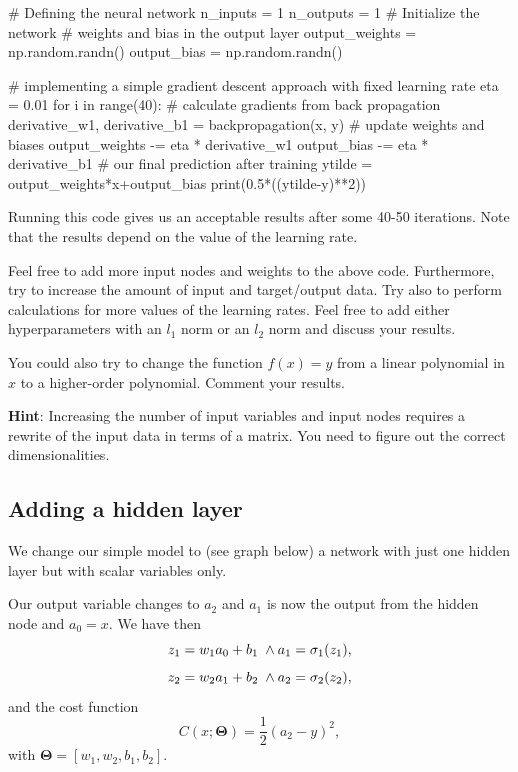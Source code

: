 \documentclass[%
oneside,                 %
final,                   %
10pt]{article}
\newenvironment{doconceexercise}{}{}
\newcounter{doconceexercisecounter}
\begin{document}
# Defining the neural network
n_inputs = 1
n_outputs = 1
# Initialize the network
# weights and bias in the output layer
output_weights = np.random.randn()
output_bias = np.random.randn()

# implementing a simple gradient descent approach with fixed learning rate
eta = 0.01
for i in range(40):
    # calculate gradients from back propagation
    derivative_w1, derivative_b1 = backpropagation(x, y)
    # update weights and biases
    output_weights -= eta * derivative_w1
    output_bias -= eta * derivative_b1
# our final prediction after training
ytilde = output_weights*x+output_bias
print(0.5*((ytilde-y)**2))


\epycod

Running this code gives us an acceptable results after some 40-50 iterations. Note that the results depend on the value of the learning rate.


\begin{doconceexercise}

                             

Feel free to add more input nodes and weights to the above
code. Furthermore, try to increase the amount of input and
target/output data. Try also to perform calculations for more values
of the learning rates. Feel free to add either hyperparameters with an
$l_1$ norm or an $l_2$ norm and discuss your results.

You could also try to change the function $f(x)=y$ from a linear polynomial in $x$ to a higher-order polynomial.
Comment your results.

\textbf{Hint}: Increasing the number of input variables and input nodes requires a rewrite of the input data in terms of a matrix. You need to figure out the correct dimensionalities.

\end{doconceexercise}

\subsection{Adding a hidden layer}

We change our simple model to (see graph below)
a network with just one hidden layer but with scalar variables only.

Our output variable changes to $a_2$ and $a_1$ is now the output from the hidden node and $a_0=x$.
We have then
\[
z_1 = w_1a_0+b_1 \hspace{0.1cm} \wedge a_1 = \sigma_1(z_1),
\]
\[
z_2 = w_2a_1+b_2 \hspace{0.1cm} \wedge a_2 = \sigma_2(z_2),
\]
and the cost function
\[
C(x;\bm{\Theta})=\frac{1}{2}(a_2-y)^2,
\]
with $\bm{\Theta}=[w_1,w_2,b_1,b_2]$.
\end{document}
